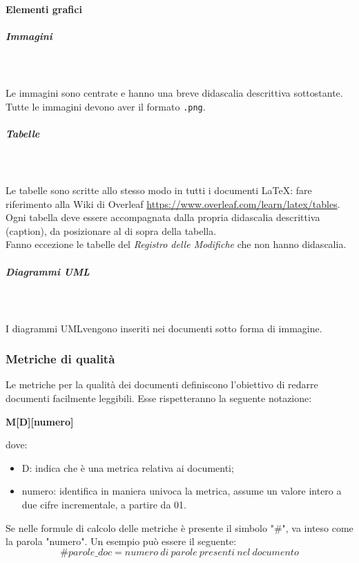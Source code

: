 \paragraph{Elementi grafici}
\subparagraph*{Immagini}\mbox{} \\ \mbox{} \\
Le immagini sono centrate e hanno una breve didascalia descrittiva sottostante. Tutte le immagini devono aver il formato \texttt{.png}\glo.

\subparagraph*{Tabelle}\mbox{} \\ \mbox{} \\
Le tabelle sono scritte allo stesso modo in tutti i documenti \LaTeX{}: fare riferimento alla Wiki di Overleaf \url{https://www.overleaf.com/learn/latex/tables}. \\
Ogni tabella deve essere accompagnata dalla propria didascalia descrittiva (caption), da posizionare al di sopra della tabella. \\
Fanno eccezione le tabelle del \textit{Registro delle Modifiche} che non hanno didascalia.

\subparagraph*{Diagrammi UML}\mbox{} \\ \mbox{} \\
I diagrammi UML\glo vengono inseriti nei documenti sotto forma di immagine.

\subsubsection{Metriche di qualità} 
\label{par:metricheDoc}
Le metriche per la qualità dei documenti definiscono l’obiettivo di redarre documenti facilmente leggibili. Esse rispetteranno la seguente notazione: \\
\centerline{\textbf{M[D][numero]}}
dove: \begin{itemize}
\item D: indica che è una metrica relativa ai documenti;
\item numero: identifica in maniera univoca la metrica, assume un valore intero a due cifre incrementale, a partire da 01.
\end{itemize}
Se nelle formule di calcolo delle metriche è presente il simbolo "\#", va inteso come la parola "numero". Un esempio può essere il seguente:
\[ \#parole\_doc = numero\ di\ parole\ presenti\ nel\ documento \]

